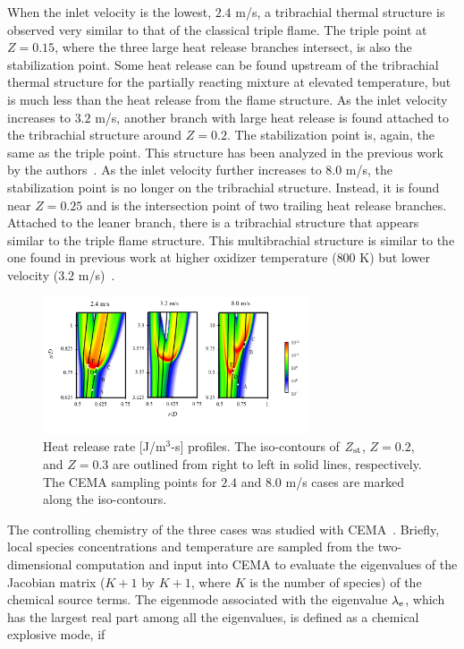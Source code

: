 \documentclass[review,3p,times]{elsarticle}
\begin{document}
When the inlet velocity is the lowest, $2.4$ m/s, a tribrachial thermal structure is observed very similar to that of the classical triple flame.  The triple point at $Z = 0.15$, where the three large heat release branches intersect, is also the stabilization point.  Some heat release can be found upstream of the tribrachial thermal structure for the partially reacting mixture at elevated temperature, but is much less than the heat release from the flame structure.  As the inlet velocity increases to $3.2$ m/s, another branch with large heat release is found attached to the tribrachial structure around $Z = 0.2$.  The stabilization point is, again, the same as the triple point.  This structure has been analyzed in the previous work by the authors~\cite{deng15}.  As the inlet velocity further increases to $8.0$ m/s, the stabilization point is no longer on the tribrachial structure.  Instead, it is found near $Z = 0.25$ and is the intersection point of two trailing heat release branches.  Attached to the leaner branch, there is a tribrachial structure that appears similar to the triple flame structure.  This multibrachial structure is similar to the one found in previous work at higher oxidizer temperature ($800$ K) but lower velocity ($3.2$ m/s)~\cite{deng15}.

\begin{figure}[t]
  \centering
  \scriptsize
  \vspace{-0.1in}
  \includegraphics[width=0.7\textwidth]{HRR_V.png}
  \normalsize
  \vspace{-0.4in}
  \caption{Heat release rate [J/m$^3$-s] profiles.  The iso-contours of $Z_{\rm st}$, $Z = 0.2$, and $Z = 0.3$ are outlined from right to left in solid lines, respectively.  The CEMA sampling points for $2.4$ and $8.0$ m/s cases are marked along the iso-contours.}
  \label{fig:HRR_V}
\end{figure}

\textcolor{cm}{The controlling chemistry of the three cases was studied with CEMA~\cite{lu10,shan12}.   Briefly, local species concentrations and temperature are sampled from the two-dimensional computation and input into CEMA to evaluate the eigenvalues of the Jacobian matrix ($K + 1$ by $K + 1$, where $K$ is the number of species) of the chemical source terms.  The eigenmode associated with the eigenvalue $\lambda_{\rm e}$, which has the largest real part among all the eigenvalues, is defined as a chemical explosive mode, if}
\end{document}

